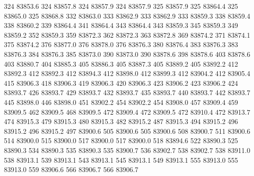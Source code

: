 324 83853.6
324 83857.8
324 83857.9
324 83857.9
325 83857.9
325 83864.4
325 83865.0
325 83868.8
332 83863.0
333 83862.9
333 83862.9
333 83859.3
338 83859.4
338 83860.2
339 83864.4
341 83864.4
343 83864.4
343 83859.3
345 83859.3
349 83859.2
352 83859.3
359 83872.3
362 83872.3
363 83872.8
369 83874.2
371 83874.1
375 83874.2
376 83877.0
376 83878.0
376 83876.3
380 83876.4
383 83876.3
383 83876.3
384 83876.3
385 83873.0
390 83873.0
390 83878.6
398 83878.6
403 83878.6
403 83880.7
404 83885.3
405 83886.3
405 83887.3
405 83889.2
405 83892.2
412 83892.3
412 83892.3
412 83894.3
412 83898.0
412 83899.3
412 83904.2
412 83905.4
415 83906.3
418 83906.3
419 83906.3
420 83906.3
423 83906.2
423 83906.2
424 83893.7
426 83893.7
429 83893.7
432 83893.7
435 83893.7
440 83893.7
442 83893.7
445 83898.0
446 83898.0
451 83902.2
454 83902.2
454 83908.0
457 83909.4
459 83909.5
462 83909.5
468 83909.5
472 83909.4
472 83909.5
472 83910.4
472 83913.7
474 83915.3
479 83915.3
480 83915.3
482 83915.2
487 83915.3
494 83915.2
496 83915.2
496 83915.2
497 83900.6
505 83900.6
505 83900.6
508 83900.7
511 83900.6
514 83900.0
515 83900.0
517 83900.0
517 83900.0
518 83894.6
522 83890.3
525 83890.3
534 83890.3
535 83890.3
535 83900.7
536 83902.7
538 83902.7
538 83911.0
538 83913.1
539 83913.1
543 83913.1
545 83913.1
549 83913.1
555 83913.0
555 83913.0
559 83906.6
566 83906.7
566 83906.7
